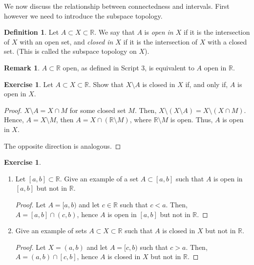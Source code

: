 \documentclass[11pt]{article}
\newcommand{\bbR}{\mathbb{R}}
\theoremstyle{definition}
\newtheorem{definition}[theorem]{Definition}
\newtheorem{exercise}[theorem]{Exercise}
\newtheorem{remark}[theorem]{Remark}
\numberwithin{equation}{section}
\begin{document}
We now discuss the relationship between connectedness and intervals. First however we need to introduce the subspace topology.


\begin{definition} Let $A\subset X\subset \bbR$. 
We say that $A$ is {\em  open in $X$} 
if it is the intersection of $X$ with an open set,
and {\em closed in $X$} if it is the intersection of $X$ with a closed set. (This is called the subspace topology on $X$).
\end{definition}


\begin{remark}  $A\subset \bbR$ open, as defined in Script 3, is equivalent to $A$  open in $\bbR$.
\end{remark}

\begin{exercise} Let $A\subset X\subset \bbR$. Show that $X\setminus A$ is closed in $X$ if, and only if, $A$ is open in $X$.
\begin{proof}
$X \setminus A = X \cap M$ for some closed set $M$. Then, $X\setminus (X \setminus A)=X \setminus(X \cap M)$. Hence, $A= X \setminus M$, then $A = X \cap (\bbR \setminus M)$, where $\bbR \setminus M$ is open. Thus, $A$ is open in $X$.

The opposite direction is analogous.


\renewcommand\qedsymbol{QED}
\end{proof}
\end{exercise}

\begin{exercise}
\renewcommand{\theenumi}{\alph{enumi}}
\begin{enumerate}
\item[a)] Let $[a,b]\subset \bbR$. Give an example of a set $A\subset [a,b]$ such that $A$ is open in $[a,b]$ but not in $\bbR$.
\begin{proof}
Let $A = [a,b)$ and let $c \in \bbR$ such that $c<a$. Then, $A = [a,b] \cap (c,b)$, hence $A$ is open in $[a,b]$ but not in $\bbR$.


\renewcommand\qedsymbol{QED}
\end{proof}
\item[b)] Give an example of sets $A\subset X\subset \bbR$ such that $A$ is closed in $X$ but not in $\bbR$.
\begin{proof}
Let $X=(a,b)$ and let $A =[c,b)$ such that $c>a$. Then, $A=(a,b) \cap [c,b]$, hence $A$ is closed in $X$ but not in $\bbR$.


\renewcommand\qedsymbol{QED}
\end{proof}
\end{enumerate}
\end{exercise}
\end{document}
